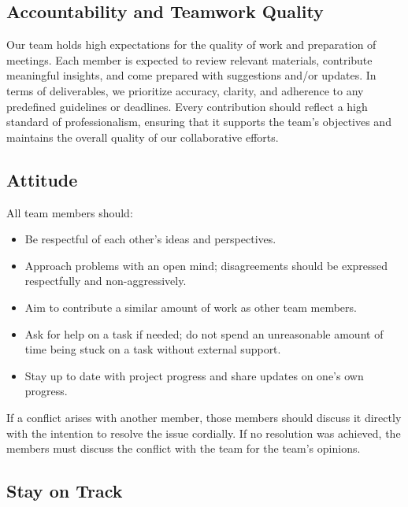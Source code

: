 \documentclass{article}
\begin{document}
\subsection{Accountability and Teamwork Quality}

Our team holds high expectations for the quality of work and preparation of meetings. Each member is expected to review relevant materials, contribute meaningful insights, and come prepared with suggestions and/or updates. In terms of deliverables, we prioritize accuracy, clarity, and adherence to any predefined guidelines or deadlines. Every contribution should reflect a high standard of professionalism, ensuring that it supports the team's objectives and maintains the overall quality of our collaborative efforts.

\subsection{Attitude}

All team members should:

\begin{itemize}
    \item Be respectful of each other's ideas and perspectives.
    \item Approach problems with an open mind; disagreements should be expressed respectfully and non-aggressively.
    \item Aim to contribute a similar amount of work as other team members.
    \item Ask for help on a task if needed; do not spend an unreasonable amount of time being stuck on a task without external support.
    \item Stay up to date with project progress and share updates on one's own progress.
\end{itemize}

If a conflict arises with another member, those members should discuss it directly with the intention to resolve the issue cordially. If no resolution was achieved, the members must discuss the conflict with the team for the team's opinions.

\subsection{Stay on Track}
\end{document}
